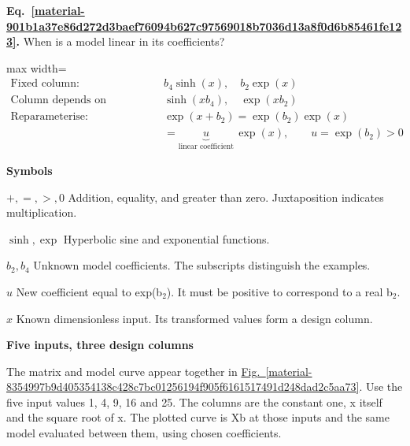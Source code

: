 \documentclass[11pt,a4paper]{article}
\begin{document}
\par\medskip
\noindent\begin{minipage}{\linewidth}
\label{material-901b1a37e86d272d3baef76094b627c97569018b7036d13a8f0d6b85461fe123}
\noindent\textbf{Eq.~\ref*{material-901b1a37e86d272d3baef76094b627c97569018b7036d13a8f0d6b85461fe123}.} When is a model linear in its coefficients?\par\nopagebreak
\begin{center}\begin{adjustbox}{max width=\linewidth}$\displaystyle \begin{aligned}\text{Fixed column:}&\quad b_4\sinh(x),\quad b_2\exp(x)\\[.55em]\text{Column depends on coefficient:}&\quad \sinh(xb_4),\quad \exp(xb_2)\\[.55em]\text{Reparameterise:}&\quad \exp(x+b_2)=\exp(b_2)\exp(x)\\[.25em]&\quad =\underbrace{u}_{\text{linear coefficient}}\,\exp(x),\qquad u=\exp(b_2)>0\end{aligned}$\end{adjustbox}\end{center}

\par\noindent\textbf{Symbols}

\par\noindent\textbf{\(+,=,>,0\)} Addition, equality, and greater than zero. Juxtaposition indicates multiplication.

\par\noindent\textbf{\(\sinh,\exp\)} Hyperbolic sine and exponential functions.

\par\noindent\textbf{\(b_2,b_4\)} Unknown model coefficients. The subscripts distinguish the examples.

\par\noindent\textbf{\(u\)} New coefficient equal to exp(b\ensuremath{{}_2}). It must be positive to correspond to a real b\ensuremath{{}_2}.

\par\noindent\textbf{\(x\)} Known dimensionless input. Its transformed values form a design column.

\end{minipage}\par
\medskip

\textbf{Five inputs, three design columns}


The matrix and model curve appear together in \hyperref[material-8354997b9d405354138c428c7bc01256194f905f6161517491d248dad2c5aa73]{Fig.~\ref*{material-8354997b9d405354138c428c7bc01256194f905f6161517491d248dad2c5aa73}}. Use the five input values 1, 4, 9, 16 and 25. The columns are the constant one, x itself and the square root of x. The plotted curve is Xb at those inputs and the same model evaluated between them, using chosen coefficients.
\end{document}
